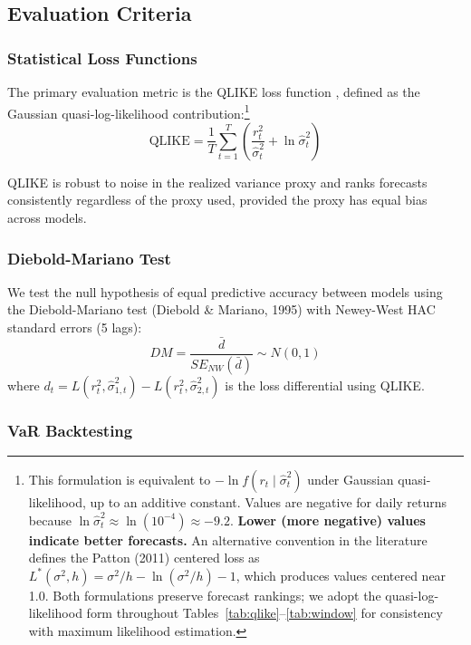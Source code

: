 \subsection{Evaluation Criteria}

\subsubsection{Statistical Loss Functions}

The primary evaluation metric is the QLIKE loss function \citep{patton2011}, defined as the Gaussian quasi-log-likelihood contribution:\footnote{This formulation is equivalent to $-\ln f(r_t \mid \hat{\sigma}^2_t)$ under Gaussian quasi-likelihood, up to an additive constant. Values are negative for daily returns because $\ln \hat{\sigma}^2_t \approx \ln(10^{-4}) \approx -9.2$. \textbf{Lower (more negative) values indicate better forecasts.} An alternative convention in the literature defines the Patton (2011) centered loss as $L^*(\sigma^2, h) = \sigma^2/h - \ln(\sigma^2/h) - 1$, which produces values centered near 1.0. Both formulations preserve forecast rankings; we adopt the quasi-log-likelihood form throughout Tables~\ref{tab:qlike}--\ref{tab:window} for consistency with maximum likelihood estimation.}
\begin{equation}
\text{QLIKE} = \frac{1}{T} \sum_{t=1}^{T} \left( \frac{r^2_t}{\hat{\sigma}^2_t} + \ln \hat{\sigma}^2_t \right)
\label{eq:qlike}
\end{equation}

QLIKE is robust to noise in the realized variance proxy and ranks forecasts consistently regardless of the proxy used, provided the proxy has equal bias across models.

\subsubsection{Diebold-Mariano Test}

We test the null hypothesis of equal predictive accuracy between models using the Diebold-Mariano test (Diebold \& Mariano, 1995) with Newey-West HAC standard errors (5 lags):
\begin{equation}
DM = \frac{\bar{d}}{SE_{NW}(\bar{d})} \sim N(0,1)
\end{equation}
where $d_t = L(r^2_t, \hat{\sigma}^2_{1,t}) - L(r^2_t, \hat{\sigma}^2_{2,t})$ is the loss differential using QLIKE.

\subsubsection{VaR Backtesting}

